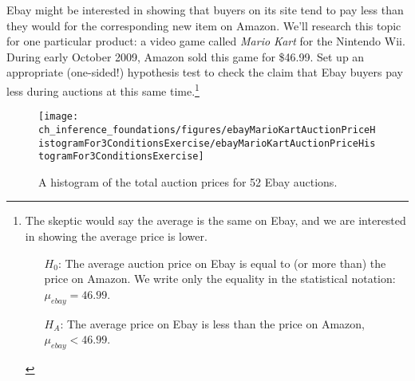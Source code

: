 \begin{exercise} \label{ebayAmazonOneSidedTestExercise}
Ebay might be interested in showing that buyers on its site tend to pay less than they would for the corresponding new item on Amazon. We'll research this topic for one particular product: a video game called \emph{Mario Kart} for the Nintendo Wii. During early October 2009, Amazon sold this game for \$46.99. Set up an appropriate (one-sided!) hypothesis test to check the claim that Ebay buyers pay less during auctions at this same time.\footnote{The skeptic would say the average is the same on Ebay, and we are interested in showing the average price is lower.
\begin{itemize}
\setlength{\itemsep}{0mm}
\item[$H_0$:] The average auction price on Ebay is equal to (or more than) the price on Amazon. We write only the equality in the statistical notation: $\mu_{ebay} = 46.99$.
\item[$H_A$:] The average price on Ebay is less than the price on Amazon, $\mu_{ebay} < 46.99$.
\end{itemize}}
\end{exercise}



\begin{figure}
   \centering
   \texttt{[image: ch\_inference\_foundations/figures/ebayMarioKartAuctionPriceHistogramFor3ConditionsExercise/ebayMarioKartAuctionPriceHistogramFor3ConditionsExercise]}
   \caption{A histogram of the total auction prices for 52 Ebay auctions.}
   \label{ebayMarioKartAuctionPriceHistogramFor3ConditionsExercise}
\end{figure}

